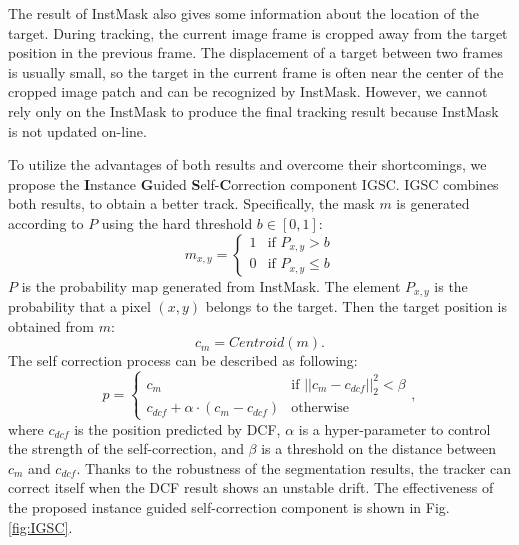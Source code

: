 \documentclass[review]{elsarticle}
\begin{document}
\begin{CJK*}{UTF8}{gbsn}
The result of InstMask also gives some information about the location of the target. During tracking, the current image frame is cropped away from the target position in the previous frame. The displacement of a target between two frames is usually small, so the target in the current frame is often near the center of the cropped image patch and can be recognized by InstMask. However, we cannot rely only on the InstMask to produce the final tracking result because InstMask is not updated on-line.

To utilize the advantages of both results and overcome their shortcomings, we propose the \textbf{I}nstance \textbf{G}uided \textbf{S}elf-\textbf{C}orrection component IGSC. IGSC combines both results, to obtain a better track. Specifically, the mask $m$ is generated according to $P$ using the hard threshold $b \in [0, 1] $:
\begin{equation}
m_{x,y} = \left\{ \begin{array}{ll}
 1 & \textrm{if $P_{x,y} > b$}\\
 0 & \textrm{if $P_{x,y} \le b$}
 \end{array} \right.
\end{equation}
$P$ is the probability map generated from InstMask. The element $P_{x,y}$ is the probability that a pixel $(x,y)$ belongs to the target.
Then the target position is obtained from $m$:
\begin{equation}
c_{m} = Centroid(m).
\end{equation}
The self correction process can be described as following:
\begin{equation}
p = \left\{ \begin{array}{ll}
 c_{m} & \textrm{if $||c_{m}-c_{dcf}||_2^2 < \beta$}\\
 c_{dcf} + \alpha \cdot (c_{m}-c_{dcf}) & \textrm{otherwise}
 \end{array} \right.,
\end{equation}
where $c_{dcf}$ is the position predicted by DCF, $\alpha$ is a hyper-parameter to control the strength of the self-correction, and $\beta$ is a threshold on the distance between $c_{m}$ and $c_{dcf}$.
Thanks to the robustness of the segmentation results, the tracker can correct itself when the DCF result shows an unstable drift. The effectiveness of the proposed instance guided self-correction component is shown in Fig. \ref{fig:IGSC}.


\end{CJK*}
\end{document}
